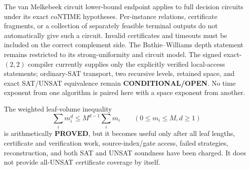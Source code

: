 \documentclass[11pt]{article}
\newcommand{\status}[1]{\textbf{#1}}
\begin{document}
The van Melkebeek circuit lower-bound endpoint applies to full decision
circuits under its exact coNTIME hypotheses.  Per-instance relations,
certificate fragments, or a collection of separately feasible terminal
outputs do not automatically give such a circuit.  Invalid certificates and
timeouts must be included on the correct complement side.  The
Bathie--Williams depth statement remains restricted to its strong-uniformity
and circuit model.  The signed exact-$(2,2)$ compiler currently supplies only
the explicitly verified local-access statements; ordinary-SAT transport,
two recursive levels, retained space, and exact SAT/UNSAT equivalence remain
\status{CONDITIONAL/OPEN}.  No time exponent from one algorithm is paired here
with a space exponent from another.

The weighted leaf-volume inequality
\[
  \sum_i m_i^d\le M^{d-1}\sum_i m_i\qquad(0\le m_i\le M, d\ge1)
\]
is arithmetically \status{PROVED}, but it becomes useful only after all leaf
lengths, certificate and verification work, source-index/gate access, failed
strategies, reconstruction, and both SAT and UNSAT soundness have been charged.
It does not provide all-UNSAT certificate coverage by itself.
\end{document}
